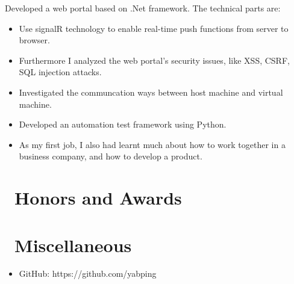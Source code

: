 \documentclass{resume}
\begin{document}
Developed a web portal based on .Net framework. The technical parts are:
\begin{itemize}
  \item Use signalR technology to enable real-time push functions from server to browser.
  \item Furthermore I analyzed the web portal’s security issues, like XSS, CSRF, SQL injection attacks.
\end{itemize}

\begin{itemize}
  \item Investigated the communcation ways between host machine and virtual machine. 
  \item Developed an automation test framework using Python. 
  \item As my first job, I also had learnt much about how to work together in a business company, and how to develop a product.
\end{itemize}



\section{\faHeartO\ Honors and Awards}

\section{\faInfo\ Miscellaneous}
\begin{itemize}[parsep=0.5ex]
  \item GitHub: https://github.com/yabping
\end{itemize}

%
%
\end{document}
